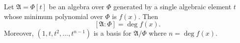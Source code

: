 Let $\mathfrak{A} = \Phi[t]$ be an algebra over $\Phi$ generated by a single algebraic element $t$ whose minimum polynomial over $\Phi$ is $f(x)$. Then
$$[\mathfrak{A} : \Phi] = \deg f(x).$$
Moreover, $(1, t, t^2, \ldots, t^{n-1})$ is a basis for $\mathfrak{A}/\Phi$ where $n = \deg f(x)$.
